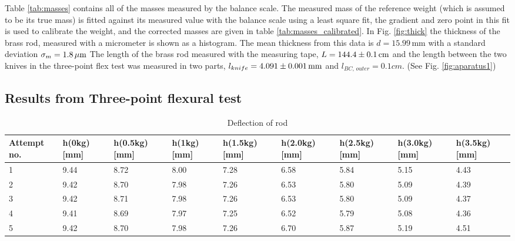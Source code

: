 \documentclass[11pt,a4paper]{article}
\begin{document}
    Table \ref{tab:masses} contains all of the masses measured by the balance scale. The measured mass of the reference weight (which is assumed to be its true mass) is fitted against its measured value with the balance scale using a least square fit, the gradient and zero point in this fit is used to calibrate the weight, and the corrected masses are given in table \ref{tab:masses_calibrated}.
    \newline
    \newline
    In Fig. \ref{fig:thick} the thickness of the brass rod, measured with a micrometer is shown as a histogram. The mean thickness from this data is $d=15.99\,$mm with a standard deviation $\sigma_m = 1.8\,\mu \textup{m}$
    \newline
    The length of the brass rod measured with the measuring tape, $L=144.4\pm 0.1\,\textup{cm}$ and the length between the two knives in the three-point flex test was measured in two parts, $l_{knife}=4.091\pm 0.001\,\textup{mm}$ and $l_{BC,\,outer}=0.1cm$. (See Fig. \ref{fig:aparatus1})





  \subsection{Results from Three-point flexural test}


    \begin{table}[H]
      \caption{Deflection of rod}
      \center
      \begin{tabular}{ | p{1.2cm} | p{1.4cm} | p{1.4cm} | p{1.4cm} | p{1.4cm} | p{1.4cm} | p{1.4cm} | p{1.4cm} | p{1.4cm} |}
          \hline
          Attempt no. & h(0kg) [mm] & h(0.5kg) [mm] & h(1kg) [mm] & h(1.5kg) [mm] & h(2.0kg) [mm] & h(2.5kg) [mm] & h(3.0kg) [mm] & h(3.5kg) [mm] \\ 
          \hline
          1 & 9.44 & 8.72 & 8.00 & 7.28 & 6.58 & 5.84 & 5.15 & 4.43\\ \hline
          2 & 9.42 & 8.70 & 7.98 & 7.26 & 6.53 & 5.80 & 5.09 & 4.39\\ \hline
          3 & 9.42 & 8.71 & 7.98 & 7.26 & 6.53 & 5.80 & 5.09 & 4.37\\ \hline
          4 & 9.41 & 8.69 & 7.97 & 7.25 & 6.52 & 5.79 & 5.08 & 4.36\\ \hline
          5 & 9.42 & 8.70 & 7.98 & 7.26 & 6.70 & 5.87 & 5.19 & 4.51\\ \hline
      \end{tabular}
      \label{tab:flex}
    \end{table}
\end{document}
